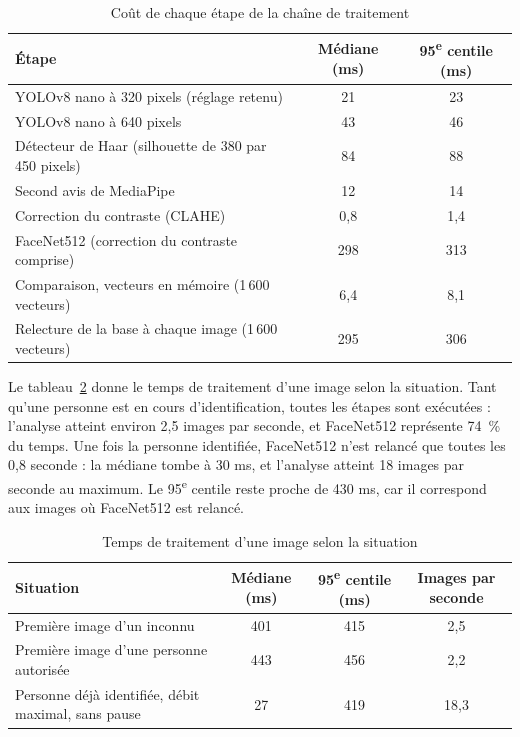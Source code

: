 \begin{table}[H]
\centering
\caption{Coût de chaque étape de la chaîne de traitement\majmark}\label{tab:etapes}
\small
\begin{tabularx}{\textwidth}{@{}Xcc@{}}
\toprule
\textbf{Étape} & \textbf{Médiane (ms)} & \textbf{95\textsuperscript{e} centile (ms)} \\
\midrule
YOLOv8 nano à 320 pixels (réglage retenu) & 21 & 23 \\
YOLOv8 nano à 640 pixels & 43 & 46 \\
Détecteur de Haar (silhouette de 380 par 450 pixels) & 84 & 88 \\
Second avis de MediaPipe & 12 & 14 \\
Correction du contraste (CLAHE) & 0,8 & 1,4 \\
FaceNet512 (correction du contraste comprise) & 298 & 313 \\
Comparaison, vecteurs en mémoire (1\,600 vecteurs) & 6,4 & 8,1 \\
Relecture de la base à chaque image (1\,600 vecteurs) & 295 & 306 \\
\bottomrule
\end{tabularx}
\end{table}

\begin{maj}
Le tableau~\ref{tab:regimes} donne le temps de traitement d'une image selon la situation. Tant qu'une personne est en cours d'identification, toutes les étapes sont exécutées : l'analyse atteint environ 2,5 images par seconde, et FaceNet512 représente 74~\% du temps. Une fois la personne identifiée, FaceNet512 n'est relancé que toutes les 0,8 seconde : la médiane tombe à 30 ms, et l'analyse atteint 18 images par seconde au maximum. Le 95\textsuperscript{e} centile reste proche de 430 ms, car il correspond aux images où FaceNet512 est relancé.
\end{maj}

\begin{table}[H]
\centering
\caption{Temps de traitement d'une image selon la situation\majmark}\label{tab:regimes}
\small
\begin{tabularx}{\textwidth}{@{}Xccc@{}}
\toprule
\textbf{Situation} & \textbf{Médiane (ms)} & \textbf{95\textsuperscript{e} centile (ms)} & \textbf{Images par seconde} \\
\midrule
Première image d'un inconnu & 401 & 415 & 2,5 \\
Première image d'une personne autorisée & 443 & 456 & 2,2 \\
Personne déjà identifiée, débit maximal, sans pause\nouvmark{} & 27 & 419 & 18,3 \\
\bottomrule
\end{tabularx}
\end{table}

